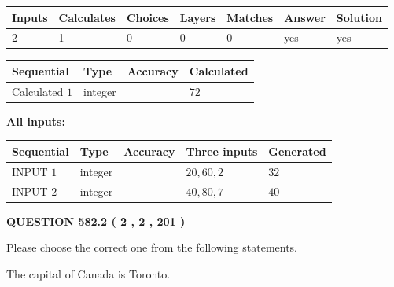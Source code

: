 \documentclass[12pt]{article}
\begin{document}
 

 
   
   
   
   
\noindent\begin{tabular}{|l|l|l|l|l|l|l|}
 \hline
Inputs & Calculates & Choices & Layers & Matches & Answer & Solution \\ \hline
 2  & 
 1  & 
 0
  & 
 0  & 
 0  & 
  yes & 
  yes 
  \\ \hline
 \end{tabular}
   
   
   
   
\noindent{}
   
   
  
  
\noindent\begin{tabular}{|l|l|l|l|}
\hline
 Sequential & Type & Accuracy & Calculated \\ 
\hline
 
 
  Calculated $  1 $ & integer &  & 
  $ 72 $ 
 \\  \hline  
 \end{tabular}
   
   
   
   
\noindent\vspace{0.1in}\hspace{-0.08in} {\textbf{\Large{All inputs: }}}
   
   
  
  
\noindent\begin{tabular}{|l|l|l|l|l|}
\hline
 Sequential & Type & Accuracy & Three inputs & Generated \\ 
\hline
 
 
  INPUT $  1 $ & integer &  & $
 20
 , 
 60
 , 
 2
 $ & $ 32 $ 
 \\  \hline  
 
 
  INPUT $  2 $ & integer &  & $
 40
 , 
 80
 , 
 7
 $ & $ 40 $ 
 \\  \hline  
 \end{tabular}
   
   
  
\vspace{0.2in}
  
{\textbf{\Large{QUESTION
582.2 
 ( 2 , 2 , 201 )
}}}
  
  
Please choose the correct one from the following statements.
 
 
The capital of Canada is Toronto.
 
\end{document}
